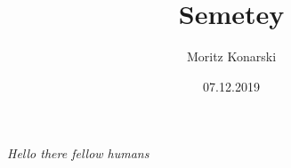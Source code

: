 \documentclass[12pt,a4paper]{article}
\begin{document}
\title{Semetey}
\author{Moritz Konarski}
\date{07.12.2019}
\maketitle

\emph{Hello there fellow humans}
\end{document}
